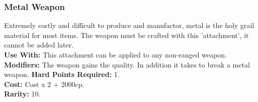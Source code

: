 \subsubsection{Metal Weapon}
Extremely costly and difficult to produce and manufactor, metal is the holy grail
material for most items. The weapon must be crafted with this 'attachment', it
cannot be added later.\\
\textbf{Use With:} This attachment can be applied to any non-ranged weapon.\\
\textbf{Modifiers:}
    The weapon gains the  quality.
    In addition it takes \despair\despair to break a metal weapon.
\textbf{Hard Points Required:} 1.\\
\textbf{Cost:} Cost x 2 + 2000cp.\\
\textbf{Rarity:} 10.\\
